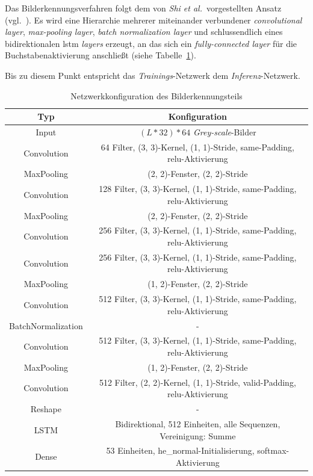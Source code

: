 Das Bilderkennungsverfahren folgt dem von \textit{Shi et al.}\ vorgestellten Ansatz (vgl.~\cite{shi2017}). Es wird eine
Hierarchie mehrerer miteinander verbundener \textit{convolutional layer}, \textit{max-pooling layer},
\textit{batch normalization layer} und schlussendlich eines bidirektionalen \gls{lstm} \textit{layers} erzeugt, an das
sich ein \textit{fully-connected layer} für die Buchstabenaktivierung anschließt (siehe
Tabelle~\ref{daten:bilderkennung:conv}).

Bis zu diesem Punkt entspricht das \textit{Trainings}-Netzwerk dem \textit{Inferenz}-Netzwerk.

\begin{table}
    \caption{Netzwerkkonfiguration des Bilderkennungsteils}
    \centering
    \begin{tabular}{|c|c|}
        \hline
        \textbf{Typ} & \textbf{Konfiguration}\\ \hline \hline
        Input & $(L * 32) * 64$ \textit{Grey-scale}-Bilder\\ \hline
        Convolution & 64 Filter, (3, 3)-Kernel, (1, 1)-Stride, same-Padding, relu-Aktivierung\\ \hline
        MaxPooling & (2, 2)-Fenster, (2, 2)-Stride\\ \hline
        Convolution & 128 Filter, (3, 3)-Kernel, (1, 1)-Stride, same-Padding, relu-Aktivierung\\ \hline
        MaxPooling & (2, 2)-Fenster, (2, 2)-Stride\\ \hline
        Convolution & 256 Filter, (3, 3)-Kernel, (1, 1)-Stride, same-Padding, relu-Aktivierung\\ \hline
        Convolution & 256 Filter, (3, 3)-Kernel, (1, 1)-Stride, same-Padding, relu-Aktivierung\\ \hline
        MaxPooling & (1, 2)-Fenster, (2, 2)-Stride\\ \hline
        Convolution & 512 Filter, (3, 3)-Kernel, (1, 1)-Stride, same-Padding, relu-Aktivierung\\ \hline
        BatchNormalization & - \\ \hline
        Convolution & 512 Filter, (3, 3)-Kernel, (1, 1)-Stride, same-Padding, relu-Aktivierung\\ \hline
        MaxPooling & (1, 2)-Fenster, (2, 2)-Stride\\ \hline
        Convolution & 512 Filter, (2, 2)-Kernel, (1, 1)-Stride, valid-Padding, relu-Aktivierung\\ \hline
        Reshape & - \\ \hline
        LSTM & Bidirektional, 512 Einheiten, alle Sequenzen, Vereinigung: Summe\\ \hline
        Dense & 53 Einheiten, he\_normal-Initialisierung, softmax-Aktivierung\\ \hline
    \end{tabular}
    \label{daten:bilderkennung:conv}
\end{table}

